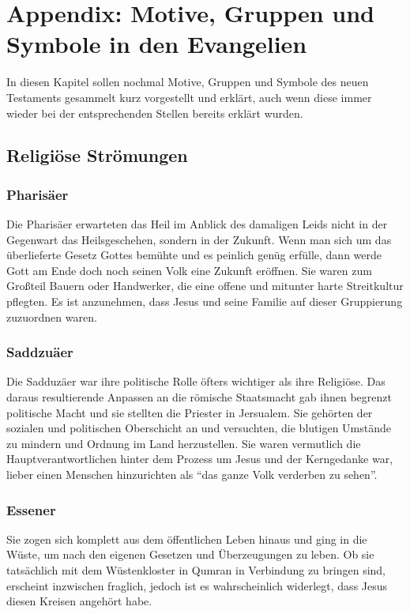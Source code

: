 \chapter{Appendix: Motive, Gruppen und Symbole in den Evangelien}
In diesen Kapitel sollen nochmal Motive, Gruppen und Symbole des neuen Testaments gesammelt kurz vorgestellt und erklärt, auch wenn diese immer wieder bei der entsprechenden Stellen bereits erklärt wurden.

\section{Religiöse Strömungen}
\subsection{Pharisäer}
Die Pharisäer erwarteten das Heil im Anblick des damaligen Leids nicht in der Gegenwart das Heilsgeschehen, sondern in der Zukunft. Wenn man sich um das überlieferte Gesetz Gottes bemühte und es peinlich genüg erfülle, dann werde Gott am Ende doch noch seinen Volk eine Zukunft eröffnen. Sie waren zum Großteil Bauern oder Handwerker, die eine offene und mitunter harte Streitkultur pflegten. Es ist anzunehmen, dass Jesus und seine Familie auf dieser Gruppierung zuzuordnen waren.

\subsection{Saddzuäer}
Die Sadduzäer war ihre politische Rolle öfters wichtiger als ihre Religiöse. Das daraus resultierende Anpassen an die römische Staatsmacht gab ihnen begrenzt politische Macht und sie stellten die Priester in Jersualem. Sie gehörten der sozialen und politischen Oberschicht an und versuchten, die blutigen Umstände zu mindern und Ordnung im Land herzustellen. Sie waren vermutlich die Hauptverantwortlichen hinter dem Prozess um Jesus und der Kerngedanke war, lieber einen Menschen hinzurichten als ``das ganze Volk verderben zu sehen''.

\subsection{Essener}
Sie zogen sich komplett aus dem öffentlichen Leben hinaus und ging in die Wüste, um nach den eigenen Gesetzen und Überzeugungen zu leben. Ob sie tatsächlich mit dem Wüstenkloster in Qumran in Verbindung zu bringen sind, erscheint inzwischen fraglich, jedoch ist es wahrscheinlich widerlegt, dass Jesus diesen Kreisen angehört habe.

